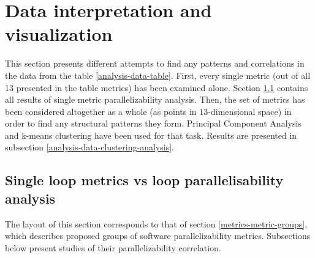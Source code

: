 \section{Data interpretation and visualization}
\label{analysis-data-interpretation-and-visualization}
\qquad This section presents different attempts to find any patterns and correlations in the data from the table \ref{analysis-data-table}. First, every single metric (out of all 13 presented in the table metrics) has been examined alone. Section \ref{analysis-single-metrics-vs-parallelizability} contains all results of single metric parallelizability analysis. Then, the set of metrics has been considered altogether as a whole (as points in 13-dimensional space) in order to find any structural patterns they form. Principal Component Analysis and k-means clustering have been used for that task. Results are presented in subsection \ref{analysis-data-clustering-analysis}.
\subsection{Single loop metrics vs loop parallelisability analysis}
\label{analysis-single-metrics-vs-parallelizability}
\qquad The layout of this section corresponds to that of section \ref{metrics-metric-groups}, which describes proposed groups of software parallelizability metrics. Subsections below present studies of their parallelizability correlation.
